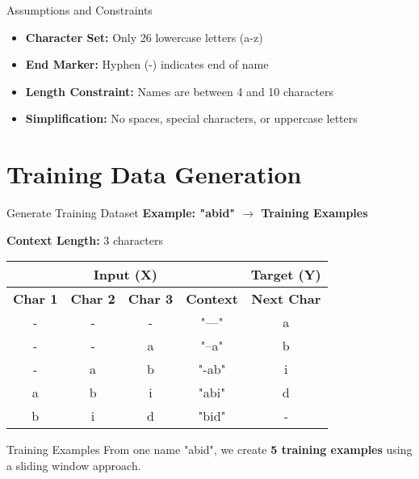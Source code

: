 \documentclass[usenames,dvipsnames]{beamer}
\begin{document}
\begin{frame}{Assumptions and Constraints}
\begin{itemize}[<+->]
\item \textbf{Character Set:} Only 26 lowercase letters (a-z)
\item \textbf{End Marker:} Hyphen (-) indicates end of name
\item \textbf{Length Constraint:} Names are between 4 and 10 characters
\item \textbf{Simplification:} No spaces, special characters, or uppercase letters
\end{itemize}

\pause
\vspace{0.5cm}
\begin{center}
\end{center}
\end{frame}

\section{Training Data Generation}

\begin{frame}{Generate Training Dataset}
\textbf{Example: "abid" $\rightarrow$ Training Examples}

\vspace{0.5cm}
\textbf{Context Length:} 3 characters

\vspace{0.5cm}
\begin{center}
\begin{tabular}{|c|c|c|c||c|}
\hline
\multicolumn{4}{|c|}{\textbf{Input (X)}} & \textbf{Target (Y)} \\
\hline
\textbf{Char 1} & \textbf{Char 2} & \textbf{Char 3} & \textbf{Context} & \textbf{Next Char} \\
\hline
- & - & - & "---" & a \\
- & - & a & "--a" & b \\
- & a & b & "-ab" & i \\
a & b & i & "abi" & d \\
b & i & d & "bid" & - \\
\hline
\end{tabular}
\end{center}

\vspace{0.5cm}
\begin{alertblock}{Training Examples}
From one name "abid", we create \textbf{5 training examples} using a sliding window approach.
\end{alertblock}
\end{frame}
\end{document}
